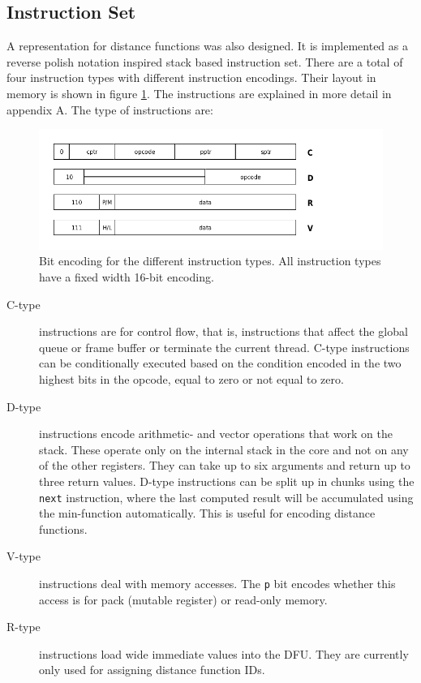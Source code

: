 		\subsection{Instruction Set}

			A representation for distance functions was also designed. It is
			implemented as a reverse polish notation inspired stack based
			instruction set. There are a total of four instruction types with
			different instruction encodings. Their layout in memory is shown in
			figure \ref{encodingfig}. The instructions are explained in more
			detail in appendix A. The type of instructions are:

			\begin{figure}[htb]
				\centering
				\caption{Bit encoding for the different instruction types. All
					instruction types have a fixed width 16-bit encoding.}
				\label{encodingfig}
				\includegraphics[width=0.75\linewidth]{figure/pdf/instruction_layout} 
			\end{figure}

			\begin{description} 
				\item[C-type] instructions are for control flow, that
						is, instructions that affect the global queue or frame buffer or
						terminate the current thread. C-type instructions can be
						conditionally executed based on the condition encoded in the two
						highest bits in the opcode, equal to zero or not equal to zero. 

				\item[D-type] instructions encode arithmetic- and vector
					operations that work on the stack. These operate only on the
					internal stack in the core and not on any of the other
					registers. They can take up to six arguments and return up
					to three return values. D-type instructions can be split up
					in chunks using the \texttt{next} instruction, where the
					last computed result will be accumulated using the min-function
					automatically. This is useful for encoding distance functions.

				\item[V-type] instructions deal with memory accesses. The
					\texttt{p} bit encodes whether this access is for pack
					(mutable register) or read-only memory.

				\item[R-type] instructions load wide immediate values into the
					DFU. They are currently only used for assigning distance
					function IDs.
			\end{description}

